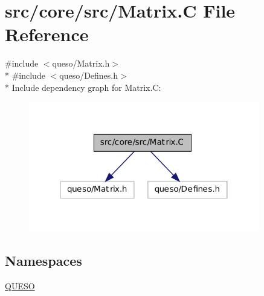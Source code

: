 \hypertarget{_matrix_8_c}{\section{src/core/src/\-Matrix.C File Reference}
\label{_matrix_8_c}
}
{\ttfamily \#include $<$queso/\-Matrix.\-h$>$}\\*
{\ttfamily \#include $<$queso/\-Defines.\-h$>$}\\*
Include dependency graph for Matrix.\-C\-:
\nopagebreak
\begin{figure}[H]
\begin{center}
\leavevmode
\includegraphics[width=286pt]{_matrix_8_c__incl}
\end{center}
\end{figure}
\subsection*{Namespaces}
\begin{DoxyCompactItemize}
\item 
\hyperlink{namespace_q_u_e_s_o}{Q\-U\-E\-S\-O}
\end{DoxyCompactItemize}
